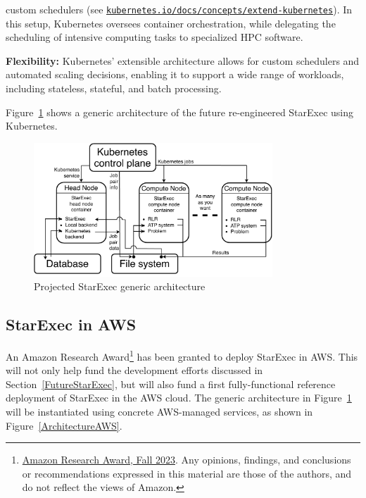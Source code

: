 \documentclass{easychair}
\newenvironment{packed_itemize}{
\vspace*{-0.3em}
\begin{itemize}
\setlength{\partopsep}{0pt}
\setlength{\itemsep}{1pt}
\setlength{\parskip}{0pt}
\setlength{\parsep}{0pt}
}{\end{itemize}}
\begin{document}
\begin{enumerate}
\begin{packed_itemize}
{           custom schedulers (see 
           \href{https://kubernetes.io/docs/concepts/extend-kubernetes/}{\tt kubernetes.io/docs/concepts/extend-kubernetes}). 
           In this setup, Kubernetes oversees container orchestration, while delegating the 
           scheduling of intensive computing tasks to specialized HPC software.}
	 \item \textbf{Flexibility:} Kubernetes' extensible architecture allows for custom schedulers 
           and automated scaling decisions, enabling it to support a wide range of workloads, 
           including stateless, stateful, and batch processing.
     \end{packed_itemize}
\end{enumerate}

Figure~\ref{ArchitectureK} shows a generic architecture of the future re-engineered StarExec 
using Kubernetes.

\begin{figure}[htb]
\begin{center}
\includegraphics[width=0.8\textwidth]{ArchitectureK}
\caption{Projected StarExec generic architecture}
\label{ArchitectureK}
\end{center}
\end{figure}

\subsection{StarExec in AWS}

An Amazon Research Award\footnote{%
\href{https://www.amazon.science/research-awards/recipients/geoffrey-sutcliffe}
{Amazon Research Award, Fall 2023}.
Any opinions, findings, and conclusions or recommendations expressed in this material are those 
of the authors, and do not reflect the views of Amazon.} 
has been granted to deploy StarExec in AWS.
This will not only help fund the development efforts discussed in Section~\ref{FutureStarExec}, 
but will also fund a first fully-functional reference deployment of StarExec in the AWS cloud. 
The generic architecture in Figure~\ref{ArchitectureK} will be instantiated using concrete 
AWS-managed services, as shown in Figure~\ref{ArchitectureAWS}.
\end{document}
